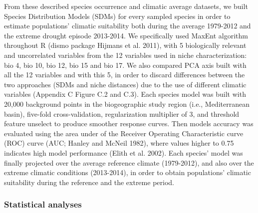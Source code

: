 \documentclass[11pt,twoside]{reedthesis}
\begin{document}
From these described species occurrence and climatic average datasets,
we built Species Distribution Models (SDMs) for every sampled species in
order to estimate populations' climatic suitability both during the
average 1979-2012 and the extreme drought episode 2013-2014. We
specifically used MaxEnt algorithm throughout R (dismo package Hijmans
et al. 2011), with 5 biologically relevant and uncorrelated variables
from the 12 variables used in niche characterization: bio 4, bio 10, bio
12, bio 15 and bio 17. We also compared PCA axis built with all the 12
variables and with this 5, in order to discard differences between the
two approaches (SDMs and niche distances) due to the use of different
climatic variables (Appendix C Figure C.2 and C.3). Each species model
was built with 20,000 background points in the biogeographic study
region (i.e., Mediterranean basin), five-fold cross-validation,
regularization multiplier of 3, and threshold feature unselect to
produce smoother response curves. Then models accuracy was evaluated
using the area under of the Receiver Operating Characteristic curve
(ROC) curve (AUC; Hanley and McNeil 1982), where values higher to 0.75
indicates high model performance (Elith et al. 2002). Each species'
model was finally projected over the average reference climate
(1979-2012), and also over the extreme climatic conditions (2013-2014),
in order to obtain populations' climatic suitability during the
reference and the extreme period.\par

\subsubsection{Statistical analyses}\label{statistical-analyses-1}
\end{document}
